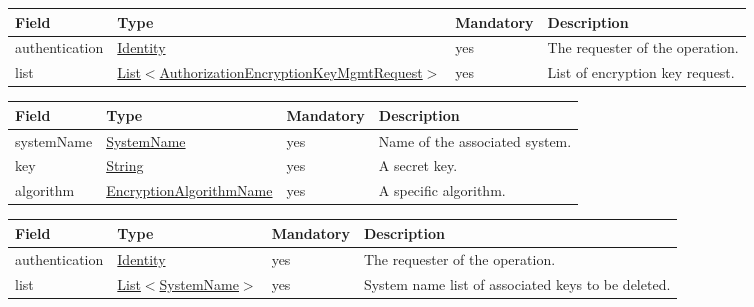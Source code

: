 \documentclass[a4paper]{arrowhead}
\newcommand{\pref}[1]{{\textcolor{ArrowheadGrey}{\hyperref[sec:model:primitives:#1]{#1}}}}
\begin{document}
\clearpage


\begin{table}[ht!]
\begin{tabularx}{\textwidth}{| p{2.5cm} | p{7.5cm} | p{2cm} | X |} \hline
\rowcolor{gray!33} Field & Type & Mandatory & Description \\ \hline
authentication & \hyperref[sec:model:Identity]{Identity} & yes & The requester of the operation. \\ \hline
list & \pref{List}$<$\hyperref[sec:model:AuthorizationEncryptionKeyMgmtRequest]{AuthorizationEncryptionKeyMgmtRequest}$>$ & yes & List of encryption key request. \\ \hline
\end{tabularx}
\end{table}


\begin{table}[ht!]
\begin{tabularx}{\textwidth}{| p{3cm} | p{4.5cm} | p{2cm} | X |} \hline
\rowcolor{gray!33} Field & Type & Mandatory & Description \\ \hline
systemName & \pref{SystemName} & yes & Name of the associated system. \\ \hline
key & \pref{String} & yes & A secret key. \\ \hline
algorithm & \pref{EncryptionAlgorithmName} & yes & A specific algorithm. \\ \hline
\end{tabularx}
\end{table}


\begin{table}[ht!]
\begin{tabularx}{\textwidth}{| p{2.5cm} | p{4cm} | p{2cm} | X |} \hline
\rowcolor{gray!33} Field & Type & Mandatory & Description \\ \hline
authentication & \hyperref[sec:model:Identity]{Identity} & yes & The requester of the operation. \\ \hline
list & \pref{List}$<$\pref{SystemName}$>$ & yes & System name list of associated keys to be deleted. \\ \hline
\end{tabularx}
\end{table}
\end{document}
